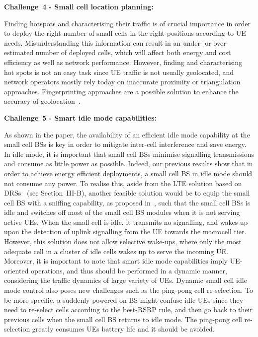\documentclass{IEEEtran}
\begin{document}
{\bf Challenge~4 - Small cell location planning:}

Finding hotspots and characterising their traffic is of crucial importance in order to deploy the right number of small cells in the right positions according to \ac{UE} needs.
Misunderstanding this information can result in an under- or over-estimated number of deployed cells,
which will affect both energy and cost efficiency as well as network performance.
However, finding and characterising hot spots is not an easy task since \ac{UE} traffic is not usually geolocated,
and network operators mostly rely today on inaccurate proximity or triangulation approaches.
Fingerprinting approaches are a possible solution to enhance the accuracy of geolocation~\cite{1458273}.


{\bf Challenge~5 - Smart idle mode capabilities:}

As shown in the paper,
the availability of an efficient idle mode capability at the small cell \acp{BS} is key in order to mitigate inter-cell interference and save energy.
In idle mode,
it is important that small cell \acp{BS} minimise signalling transmissions and consume as little power as possible.
Indeed, our previous results show that in order to achieve energy efficient deployments,
a small cell \ac{BS} in idle mode should not consume any power.
To realise this,
aside from the LTE solution based on \acp{DRS}~\cite{LTE-R12} (see Section~III-B),
another feasible solution would be to equip the small cell \ac{BS} with a sniffing capability,
as proposed in~\cite{Ashraf:10a},
such that the small cell \acp{BS} is idle and switches off most of the small cell \ac{BS} modules when it is not serving active \acp{UE}.
When the small cell is idle, it transmits no signalling,
and wakes up upon the detection of uplink signalling from the \ac{UE} towards the macrocell tier.
However, this solution does not allow selective wake-ups,
where only the most adequate cell in a cluster of idle cells wakes up to serve the incoming \ac{UE}.
Moreover, it is important to note that smart idle mode capabilities imply \ac{UE}-oriented operations,
and thus should be performed in a dynamic manner,
considering the traffic dynamics of large variety of \acp{UE}.
Dynamic small cell idle mode control also poses new challenges such as the ping-pong cell re-selection.
To be more specific,
a suddenly powered-on \ac{BS} might confuse idle \acp{UE} since they need to re-select cells according to the best-\ac{RSRP} rule,
and then go back to their previous cells when the small cell \ac{BS} returns to idle mode.
The ping-pong cell re-selection greatly consumes \acp{UE} battery life and it should be avoided.
\end{document}
